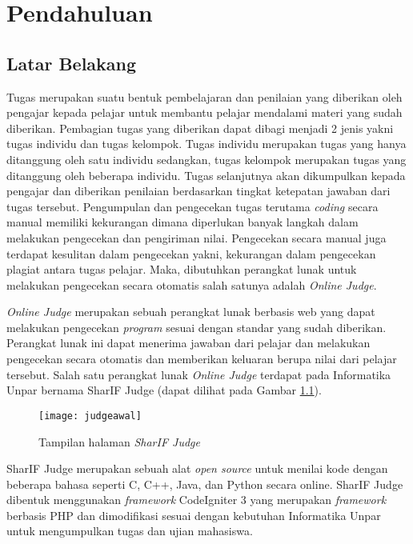 \chapter{Pendahuluan}
\label{chap:intro}
   
\section{Latar Belakang}
\label{sec:label}

Tugas merupakan suatu bentuk pembelajaran dan penilaian yang diberikan oleh pengajar kepada pelajar untuk membantu pelajar mendalami materi yang sudah diberikan. Pembagian tugas yang diberikan dapat dibagi menjadi 2 jenis yakni tugas individu dan tugas kelompok. Tugas individu merupakan tugas yang hanya ditanggung oleh satu individu sedangkan, tugas kelompok merupakan tugas yang ditanggung oleh beberapa individu. Tugas selanjutnya akan dikumpulkan kepada pengajar dan diberikan penilaian berdasarkan tingkat ketepatan jawaban dari tugas tersebut. Pengumpulan dan pengecekan tugas terutama \textit{coding} secara manual memiliki kekurangan dimana diperlukan banyak langkah dalam melakukan pengecekan dan pengiriman nilai. Pengecekan secara manual juga terdapat kesulitan dalam pengecekan yakni, kekurangan dalam pengecekan plagiat antara tugas pelajar. Maka, dibutuhkan perangkat lunak untuk melakukan pengecekan secara otomatis salah satunya adalah \textit{Online Judge}.

\textit{Online Judge} merupakan sebuah perangkat lunak berbasis web yang dapat melakukan pengecekan \textit{program} sesuai dengan standar yang sudah diberikan. Perangkat lunak ini dapat menerima jawaban dari pelajar dan melakukan pengecekan secara otomatis dan memberikan keluaran berupa nilai dari pelajar tersebut. Salah satu perangkat lunak \textit{Online Judge} terdapat pada Informatika Unpar bernama SharIF Judge (dapat dilihat pada Gambar  \ref{fig:judgeawal}). 

\begin{figure}[H]
	\centering  
	\texttt{[image: judgeawal]}  
	\caption[Tampilan halaman \textit{SharIF Judge}]{Tampilan halaman \textit{SharIF Judge}} 
	\label{fig:judgeawal} 
\end{figure} 


SharIF Judge merupakan sebuah alat \textit{open source} untuk menilai kode dengan beberapa bahasa seperti C, C++, Java, dan Python secara online. SharIF Judge dibentuk menggunakan \textit{framework} CodeIgniter 3 yang merupakan \textit{framework} berbasis PHP dan dimodifikasi sesuai dengan kebutuhan Informatika Unpar untuk mengumpulkan tugas dan ujian mahasiswa. 

